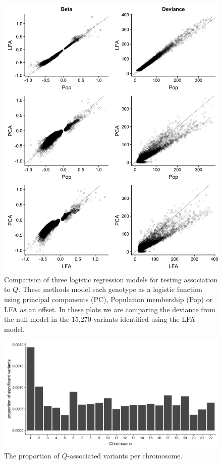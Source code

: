 \documentclass[9pt,lineno]{template}
\begin{document}
\begin{figure}[h]
\centering
\includegraphics[width=15cm,keepaspectratio]{../Figures/fits_Significant_Positions_CompareModels.jpg}
\caption{Comparison of three logistic regression models for testing association to $Q$.
These methods model each genotype as a logistic function using principal components (PC), Population membership (Pop) or LFA as an offset.
In these plots we are comparing the deviance from the null model in the 15,270 variants identified using the LFA model.}  
\label{CompareModel}
\end{figure}

\begin{figure}[h]
\centering
\includegraphics[width=15cm,keepaspectratio]{../Figures/CountPerChrom.jpg}
\caption{The proportion of $Q$-associated variants per chromosome.}  
\label{CountPerChrom}
\end{figure}
\end{document}
